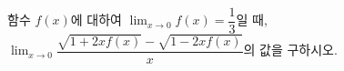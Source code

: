 함수 $f(x)$에 대하여 $\displaystyle\lim_{x\to 0} f(x)=\dfrac{1}{3}$일 때, $\displaystyle\lim_{x\to 0}\dfrac{\sqrt{1+2xf(x)}-\sqrt{1-2xf(x)}}{x}$의 값을 구하시오.
